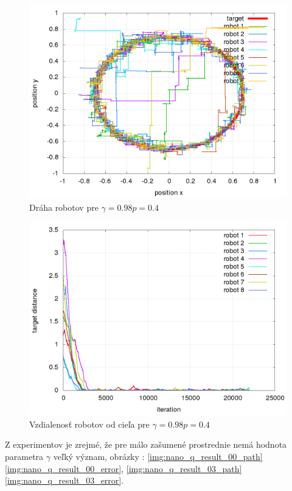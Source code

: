 \begin{figure}[!htb]
\centering
\includegraphics[scale=.4]{../../results_q_learning/nano_q_learning/result_04_04/robot_path.png}
\caption{Dráha robotov pre $\gamma = 0.98 p = 0.4$}
\label{img:nano_q_result_04_4_path}
\end{figure}

\begin{figure}[!htb]
\centering
\includegraphics[scale=.4]{../../results_q_learning/nano_q_learning/result_04_04/robot_reward.png}
\caption{Vzdialenosť robotov od cieľa pre $\gamma = 0.98 p = 0.4$}
\label{img:nano_q_result_04_4_error}
\end{figure}

Z experimentov je zrejmé, že pre málo zašumené prostrednie nemá hodnota parametra
$\gamma$ veľký význam, obrázky :
\ref{img:nano_q_result_00_path}
\ref{img:nano_q_result_00_error},
\ref{img:nano_q_result_03_path}
\ref{img:nano_q_result_03_error}.

